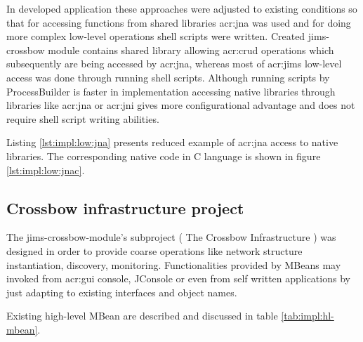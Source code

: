 \documentclass[11pt,openany]{book}
\begin{document}
        In developed application these approaches were adjusted to existing conditions so that for accessing functions
        from shared libraries \gls{acr:jna} was used and for doing more complex low-level operations shell scripts were
        written. Created jims-crossbow module contains shared library allowing
        \gls{acr:crud} operations which subsequently are being accessed by \gls{acr:jna}, whereas most of \gls{acr:jims}
        low-level access was done through running shell scripts. Although running scripts by ProcessBuilder is faster in implementation
        accessing native libraries through libraries like \gls{acr:jna} or \gls{acr:jni} gives more configurational advantage and does 
       not require shell script writing abilities.

        Listing \ref{lst:impl:low:jna} presents reduced example of \gls{acr:jna} access to native libraries. The
        corresponding native code in C language is shown in figure \ref{lst:impl:low:jnac}. \\


        \noindent
          \begin{minipage}{\textwidth}
          
        \end{minipage}  

        \noindent
        \begin{minipage}{\textwidth}
          
        \end{minipage}


      \subsection{Crossbow infrastructure project}
      \label{sec:impl:infrastructure}

        The jims-crossbow-module's subproject ( The Crossbow Infrastructure ) was designed in order to provide
        coarse operations like network structure instantiation, discovery, monitoring. 
        Functionalities provided by MBeans may invoked from \gls{acr:gui} console, JConsole or even from self written 
        applications by just adapting to existing interfaces and object names. 

        Existing high-level MBean are described and discussed in table \ref{tab:impl:hl-mbean}.
\end{document}
